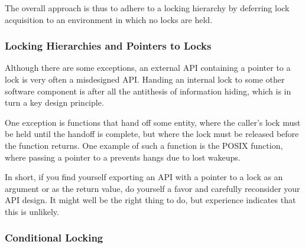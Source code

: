 The overall approach is thus to adhere to a locking hierarchy by deferring
lock acquisition to an environment in which no locks are held.

\subsubsection{Locking Hierarchies and Pointers to Locks}
\label{sec:locking:Locking Hierarchies and Pointers to Locks}

Although there are some exceptions, an external API containing a pointer
to a lock is very often a misdesigned API\@.
Handing an internal lock to some other software component is after all
the antithesis of information hiding, which is in turn a key design
principle.

\QuickQuizEnd

One exception is functions that hand off some entity,
where the caller's lock must be held until the handoff is complete,
but where the lock must be released before the function returns.
One example of such a function is the POSIX 
function, where passing a pointer to a 
prevents hangs due to lost wakeups.

\QuickQuizEnd

In short, if you find yourself exporting an API with a pointer to a
lock as an argument or as the return value, do yourself a favor and
carefully reconsider your API design.
It might well be the right thing to do, but experience indicates that
this is unlikely.

\subsubsection{Conditional Locking}
\label{sec:locking:Conditional Locking}

